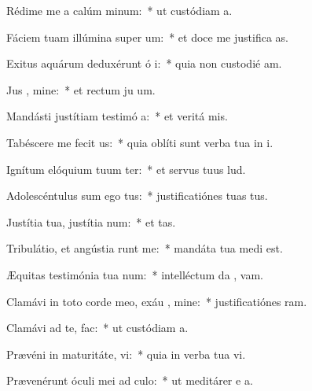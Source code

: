 \item Rédime me a calúm minum:~* ut custódiam  a.
\item Fáciem tuam illúmina super  um:~* et doce me justifica as.
\item Exitus aquárum deduxérunt ó i:~* quia non custodié  am.
\item Jus , mine:~* et rectum ju um.
\item Mandásti justítiam testimó a:~* et veritá  mis.
\item Tabéscere me fecit  us:~* quia oblíti sunt verba tua in i.
\item Ignítum elóquium tuum ter:~* et servus tuus  lud.
\item Adolescéntulus sum ego  tus:~* justificatiónes tuas   tus.
\item Justítia tua, justítia  num:~* et   tas.
\item Tribulátio, et angústia runt me:~* mandáta tua medi  est.
\item Æquitas testimónia tua  num:~* intelléctum da ,  vam.
\item Clamávi in toto corde meo, exáu , mine:~* justificatiónes  ram.
\item Clamávi ad te,   fac:~* ut custódiam  a.
\item Prævéni in maturitáte,  vi:~* quia in verba tua vi.
\item Prævenérunt óculi mei ad  culo:~* ut meditárer e a.
